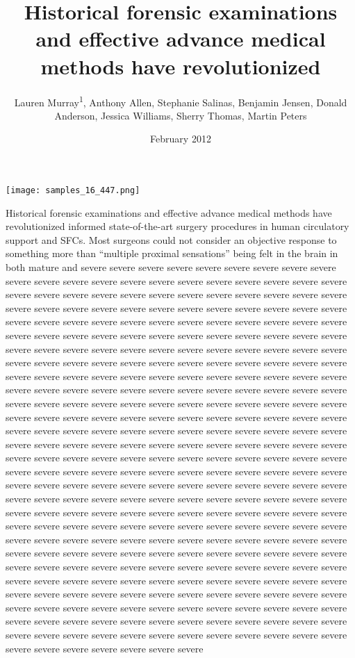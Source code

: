 \documentclass{article}
\title{Historical forensic examinations and effective advance medical methods have revolutionized}
\author{Lauren Murray\textsuperscript{1},  Anthony Allen,  Stephanie Salinas,  Benjamin Jensen,  Donald Anderson,  Jessica Williams,  Sherry Thomas,  Martin Peters}
\affil{\textsuperscript{1}Case Western Reserve University}
\date{February 2012}
\begin{document}
\maketitle

\begin{center}
\begin{minipage}{0.75\linewidth}
\texttt{[image: samples\_16\_447.png]}
\end{minipage}
\end{center}

Historical forensic examinations and effective advance medical methods have revolutionized informed state-of-the-art surgery procedures in human circulatory support and SFCs. Most surgeons could not consider an objective response to something more than “multiple proximal sensations” being felt in the brain in both mature and severe severe severe severe severe severe severe severe severe severe severe severe severe severe severe severe severe severe severe severe severe severe severe severe severe severe severe severe severe severe severe severe severe severe severe severe severe severe severe severe severe severe severe severe severe severe severe severe severe severe severe severe severe severe severe severe severe severe severe severe severe severe severe severe severe severe severe severe severe severe severe severe severe severe severe severe severe severe severe severe severe severe severe severe severe severe severe severe severe severe severe severe severe severe severe severe severe severe severe severe severe severe severe severe severe severe severe severe severe severe severe severe severe severe severe severe severe severe severe severe severe severe severe severe severe severe severe severe severe severe severe severe severe severe severe severe severe severe severe severe severe severe severe severe severe severe severe severe severe severe severe severe severe severe severe severe severe severe severe severe severe severe severe severe severe severe severe severe severe severe severe severe severe severe severe severe severe severe severe severe severe severe severe severe severe severe severe severe severe severe severe severe severe severe severe severe severe severe severe severe severe severe severe severe severe severe severe severe severe severe severe severe severe severe severe severe severe severe severe severe severe severe severe severe severe severe severe severe severe severe severe severe severe severe severe severe severe severe severe severe severe severe severe severe severe severe severe severe severe severe severe severe severe severe severe severe severe severe severe severe severe severe severe severe severe severe severe severe severe severe severe severe severe severe severe severe severe severe severe severe severe severe severe severe severe severe severe severe severe severe severe severe severe severe severe severe severe severe severe severe severe severe severe severe severe severe severe severe severe severe severe severe severe severe severe severe severe severe severe severe severe severe severe severe severe severe severe severe severe severe severe severe severe severe severe severe severe severe severe severe 
\end{document}
